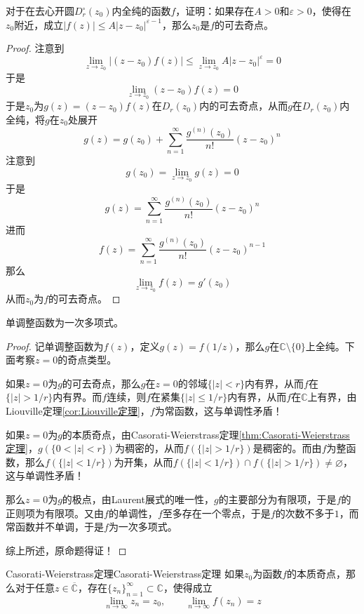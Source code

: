 \documentclass[lang = cn, scheme = chinese, thmcnt = section]{elegantbook}
\newcommand{\C}{\mathbb{C}}  		   %
\newcommand{\sub}{\subset}             %
\begin{document}
\begin{proposition}
	对于在去心开圆$D_r^\circ(z_0)$内全纯的函数$f$，证明：如果存在$A>0$和$\varepsilon>0$，使得在$z_0$附近，成立$|f(z)|\le A|z-z_0|^{\varepsilon-1}$，那么$z_0$是$f$的可去奇点。
\end{proposition}

\begin{proof}
	注意到
	$$
	\lim_{z\to z_0}|(z-z_0)f(z)|\le\lim_{z\to z_0} A|z-z_0|^\varepsilon=0
	$$
	于是
	$$
	\lim_{z\to z_0}(z-z_0)f(z)=0
	$$
	于是$z_0$为$g(z)=(z-z_0)f(z)$在$D_r(z_0)$内的可去奇点，从而$g$在$D_r(z_0)$内全纯，将$g$在$z_0$处展开
	$$
	g(z)=g(z_0)+\sum_{n=1}^{\infty}\frac{g^{(n)}(z_0)}{n!}(z-z_0)^n
	$$
	注意到
	$$
	g(z_0)=\lim_{z\to z_0}g(z)=0
	$$
	于是
	$$
	g(z)=\sum_{n=1}^{\infty}\frac{g^{(n)}(z_0)}{n!}(z-z_0)^n
	$$
	进而
	$$
	f(z)=\sum_{n=1}^{\infty}\frac{g^{(n)}(z_0)}{n!}(z-z_0)^{n-1}
	$$
	那么
	$$
	\lim_{z\to z_0}f(z)=g'(z_0)
	$$
	从而$z_0$为$f$的可去奇点。
\end{proof}

\begin{proposition}
	单调整函数为一次多项式。
\end{proposition}

\begin{proof}
	记单调整函数为$f(z)$，定义$g(z)=f(1/z)$，那么$g$在$\C\setminus\{0\}$上全纯。下面考察$z=0$的奇点类型。
	
	如果$z=0$为$g$的可去奇点，那么$g$在$z=0$的邻域$\{ |z|<r \}$内有界，从而$f$在$\{ |z|>1/r \}$内有界。而$f$连续，则$f$在紧集$\{ |z|\le 1/r \}$内有界，从而$f$在$\C$上有界，由Liouville定理\ref{cor:Liouville定理}，$f$为常函数，这与单调性矛盾！
	
	如果$z=0$为$g$的本质奇点，由Casorati-Weierstrass定理\ref{thm:Casorati-Weierstrass定理}，$g(\{ 0<|z|<r \})$为稠密的，从而$f(\{ |z|>1/r \})$是稠密的。而由$f$为整函数，那么$f(\{ |z|<1/r \})$为开集，从而$f(\{ |z|<1/r \})\cap f(\{ |z|>1/r \})\ne\varnothing$，这与单调性矛盾！
	
	那么$z=0$为$g$的极点，由Laurent展式的唯一性，$g$的主要部分为有限项，于是$f$的正则项为有限项。又由$f$的单调性，$f$至多存在一个零点，于是$f$的次数不多于$1$，而常函数并不单调，于是$f$为一次多项式。
	
	综上所述，原命题得证！
\end{proof}

\begin{theorem}{Casorati-Weierstrass定理}{Casorati-Weierstrass定理}
	如果$z_0$为函数$f$的本质奇点，那么对于任意$z\in\overline{\C}$，存在$\{z_n\}_{n=1}^{\infty}\sub\C$，使得成立
	$$
	\lim_{n\to\infty}z_n=z_0,\qquad 
	\lim_{n\to\infty}{f(z_n)}=z
	$$
\end{theorem}
\end{document}
